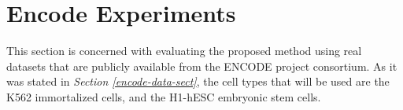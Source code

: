 \section{Encode Experiments} \label{meth-encode-experiments-sect}
This section is concerned with evaluating the proposed method using real datasets that are publicly available from the ENCODE project consortium. As it was stated in \emph{Section \ref{encode-data-sect}}, the cell types that will be used are the K562 immortalized cells, and the H1-hESC embryonic stem cells. 




